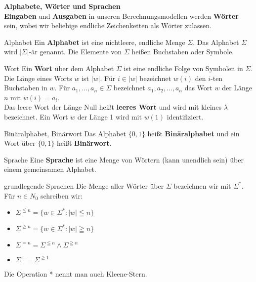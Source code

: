 \textbf{Alphabete, Wörter und Sprachen} \\
\textbf{Eingaben} und \textbf{Ausgaben} in unseren Berechnungsmodellen werden \textbf{Wörter} sein, wobei wir beliebige endliche Zeichenketten als Wörter zulassen.

\begin{defn}{Alphabet}
    Ein \textbf{Alphabet} ist eine nichtleere, endliche Menge $\Sigma$. Das Alphabet $\Sigma$ wird $|{\Sigma}|$-är genannt. Die Elemente von $\Sigma$ heißen Buchstaben oder Symbole.
\end{defn}

\begin{defn}{Wort}
    Ein \textbf{Wort} über dem Alphabet $\Sigma$ ist eine endliche Folge von Symbolen in $\Sigma$. Die Länge eines Worts $w$ ist $|w|$. Für $i \in |w|$ bezeichnet 
    $w(i)$ den $i$-ten Buchstaben in $w$. Für $a_1,..., a_n \in \Sigma$ bezeichnet $a_1, a_2,..., a_n$ das Wort $w$ der Länge $n$ mit $w(i) = a_i$. \\

    Das leere Wort der Länge Null heißt \textbf{leeres Wort} und wird mit kleines $\lambda$ bezeichnet. Ein Wort $w$ der Länge 1 wird mit $w(1)$ identifiziert.
\end{defn}

\begin{defn}{Binäralphabet, Binärwort}
    Das Alphabet $\{0,1\}$ heißt \textbf{Binäralphabet} und ein Wort über $\{0,1\}$ heißt \textbf{Binärwort}.
\end{defn}

\begin{defn}{Sprache}
    Eine \textbf{Sprache} ist eine Menge von Wörtern (kann unendlich sein) über einem gemeinsamen Alphabet.
\end{defn}

\begin{defn}{grundlegende Sprachen}
    Die Menge aller Wörter über $\Sigma$ bezeichnen wir mit $\Sigma^*$.
    Für $n \in N_0$ schreiben wir: 
    \begin{itemize}
        \item $\Sigma^{\leqq n} = \{w \in \Sigma^* : |w| \leqq n \}$
        \item $\Sigma^{\geqq n} = \{w \in \Sigma^* : |w| \geqq n \}$
        \item  $\Sigma^{=n} = \Sigma^{\leqq n} \land \Sigma^{\geqq n}$
        \item  $\Sigma^+ = \Sigma^{\geqq 1}$
    \end{itemize}
    Die Operation * nennt man auch Kleene-Stern.
\end{defn}

